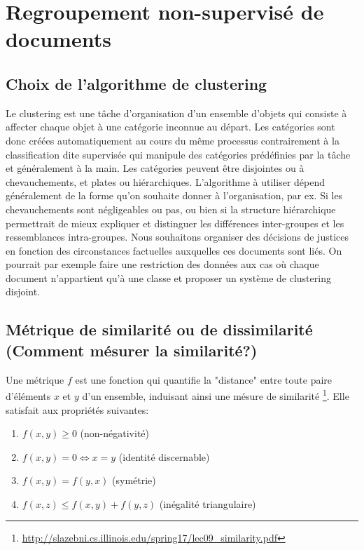 \section{Regroupement non-supervisé de documents}
\label{sec:similarite:biblio}

\subsection{Choix de l’algorithme de clustering}

Le clustering est une tâche d’organisation d’un ensemble d’objets qui consiste à affecter chaque objet à une catégorie inconnue au départ. Les catégories sont donc créées automatiquement au cours du même processus contrairement à la classification dite supervisée qui manipule des catégories prédéfinies par la tâche et généralement à la main. Les catégories peuvent être disjointes ou à chevauchements, et plates ou hiérarchiques. 
L’algorithme à utiliser dépend généralement de la forme qu’on souhaite donner à l’organisation, par ex. Si les chevauchements sont négligeables ou pas, ou bien si la structure hiérarchique permettrait de mieux expliquer et distinguer les différences inter-groupes et les ressemblances intra-groupes. Nous souhaitons organiser des décisions de justices en fonction des circonstances factuelles auxquelles ces documents sont liés.  On pourrait par exemple faire une restriction des données aux cas où chaque document n’appartient qu’à une classe et proposer un système de clustering disjoint.



\subsection{Métrique de similarité ou de dissimilarité (Comment mésurer la similarité?)}
Une métrique $f$ est une fonction qui quantifie la "distance" entre toute paire d'éléments $x$ et $y$ d'un ensemble, induisant ainsi une mésure de similarité \footnote{\url{http://slazebni.cs.illinois.edu/spring17/lec09_similarity.pdf}}. Elle satisfait aux propriétés suivantes:
\begin{enumerate}
\item $f(x,y) \geq 0$ (non-négativité)
\item $f(x,y) = 0  \Leftrightarrow x = y$ (identité discernable)
\item $f(x,y) = f(y, x)$ (symétrie)
\item $f(x,z) \leq f(x,y) + f(y,z)$ (inégalité triangulaire) \label{enum:sim:ineq-tri}
\end{enumerate}

